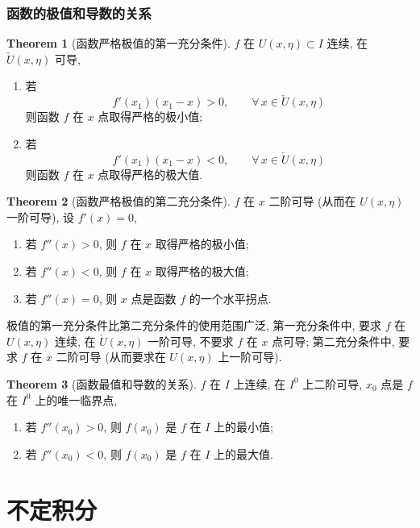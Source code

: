 \documentclass{book}
\newcommand{\Any}{\forall\,}
\newcommand{\puncU}[1]{\check{U}\!\left( #1 \right)}
\numberwithin{equation}{section}
\numberwithin{figure}{section}
\theoremstyle{definition}
\newtheorem{theorem}{Theorem}[section]
\begin{document}
\subsection{函数的极值和导数的关系}
\begin{theorem}[函数严格极值的第一充分条件]
  $f$ 在 $U(x,\eta)\subset I$  连续, 在 $\puncU{x,\eta}$ 可导,
  \begin{enumerate}
    \item 若
      \begin{equation*}
	f'(x_1)(x_1-x)>0,\qquad\Any x\in\puncU{x,\eta}
      \end{equation*}
      则函数 $f$ 在 $x$ 点取得严格的极小值;
    \item 若
      \begin{equation*}
	f'(x_1)(x_1-x)<0,\qquad\Any x\in\puncU{x,\eta}
      \end{equation*}
      则函数 $f$ 在 $x$ 点取得严格的极大值.
  \end{enumerate}
\end{theorem}
\begin{theorem}[函数严格极值的第二充分条件]
  $f$ 在 $x$ 二阶可导 (从而在 $U(x,\eta)$ 一阶可导), 设 $f'(x)=0$, 
  \begin{enumerate}
    \item 若 $f''(x)>0$, 则 $f$ 在 $x$ 取得严格的极小值;
    \item 若 $f''(x)<0$, 则 $f$ 在 $x$ 取得严格的极大值;
    \item 若 $f''(x)=0$, 则 $x$ 点是函数 $f$ 的一个水平拐点.
  \end{enumerate}
\end{theorem}
极值的第一充分条件比第二充分条件的使用范围广泛, 第一充分条件中, 要求 $f$ 在 $U(x,\eta)$ 连续, 在 $\puncU{x,\eta}$ 一阶可导, 不要求 $f$ 在 $x$ 点可导; 第二充分条件中, 要求 $f$ 在 $x$ 二阶可导 (从而要求在 $U(x,\eta)$ 上一阶可导).

\begin{theorem}[函数最值和导数的关系]
  $f$ 在 $I$ 上连续, 在 $I^0$ 上二阶可导, $x_0$ 点是 $f$ 在 $I^0$ 上的唯一临界点, 
  \begin{enumerate}
    \item 若 $f''(x_0)>0$, 则 $f(x_0)$ 是 $f$ 在 $I$ 上的最小值;
    \item 若 $f''(x_0)<0$, 则 $f(x_0)$ 是 $f$ 在 $I$ 上的最大值.
  \end{enumerate}
\end{theorem}
%
%
%
%
%
%
%
%
\chapter{不定积分}
\end{document}
